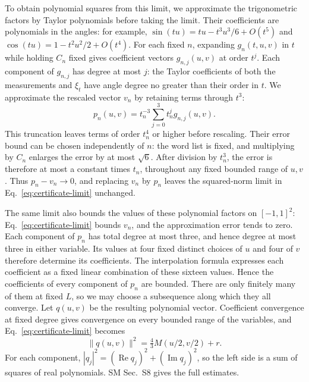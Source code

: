 \documentclass[aps,prl,twocolumn,10pt,superscriptaddress,nofootinbib,longbibliography,nobalancelastpage]{revtex4-2}
\begin{document}
To obtain polynomial squares from this limit, we approximate the trigonometric factors by Taylor polynomials before taking the limit. Their coefficients are polynomials in the angles: for example, $\sin(tu)=tu-t^3u^3/6+O(t^5)$ and $\cos(tu)=1-t^2u^2/2+O(t^4)$. For each fixed $n$, expanding $g_n(t,u,v)$ in $t$ while holding $C_n$ fixed gives coefficient vectors $g_{n,j}(u,v)$ at order $t^j$. Each component of $g_{n,j}$ has degree at most $j$: the Taylor coefficients of both the measurements and $\xi_t$ have angle degree no greater than their order in $t$. We approximate the rescaled vector $v_n$ by retaining terms through $t^3$:
\begin{equation}
p_n(u,v)=t_n^{-3}\sum_{j=0}^3t_n^jg_{n,j}(u,v).
\label{eq:polynomial-factors}
\end{equation}
This truncation leaves terms of order $t_n^4$ or higher before rescaling. Their error bound can be chosen independently of $n$: the word list is fixed, and multiplying by $C_n$ enlarges the error by at most $\sqrt6$. After division by $t_n^3$, the error is therefore at most a constant times $t_n$, throughout any fixed bounded range of $u,v$. Thus $p_n-v_n\to0$, and replacing $v_n$ by $p_n$ leaves the squared-norm limit in Eq.~\eqref{eq:certificate-limit} unchanged.

The same limit also bounds the values of these polynomial factors on $[-1,1]^2$: Eq.~\eqref{eq:certificate-limit} bounds $v_n$, and the approximation error tends to zero. Each component of $p_n$ has total degree at most three, and hence degree at most three in either variable. Its values at four fixed distinct choices of $u$ and four of $v$ therefore determine its coefficients. The interpolation formula expresses each coefficient as a fixed linear combination of these sixteen values. Hence the coefficients of every component of $p_n$ are bounded. There are only finitely many of them at fixed $L$, so we may choose a subsequence along which they all converge. Let $q(u,v)$ be the resulting polynomial vector. Coefficient convergence at fixed degree gives convergence on every bounded range of the variables, and Eq.~\eqref{eq:certificate-limit} becomes
\begin{equation}
\|q(u,v)\|^2=\tfrac43M(u/2,v/2)+r.
\label{eq:polynomial-identity}
\end{equation}
For each component, $|q_j|^2=(\operatorname{Re}q_j)^2+(\operatorname{Im}q_j)^2$, so the left side is a sum of squares of real polynomials. SM Sec.~S8 gives the full estimates.
\end{document}
